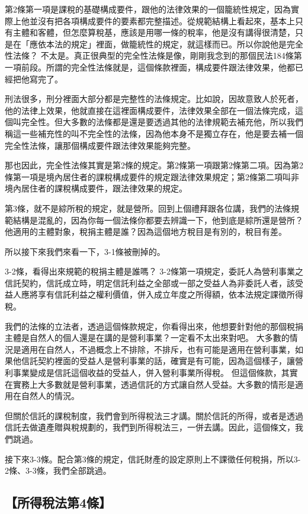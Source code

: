 \documentclass[]{ctexbook}
\begin{document}
第2條第一項是課稅的基礎構成要件，跟他的法律效果的一個籠統性規定，因為實際上他並沒有把各項構成要件的要素都完整描述。從規範結構上看起來，基本上只有主體和客體，但怎麼算稅基，應該是用哪一條的稅率，他是沒有講得很清楚，只是在「應依本法的規定」裡面，做籠統性的規定，就這樣而已。所以你說他是完全性法條？ 不太是。真正很典型的完全性法條是像，剛剛我念到的那個民法184條第一項前段。所謂的完全性法條就是，這個條款裡面，構成要件跟法律效果，他都已經把他寫完了。

刑法很多，刑分裡面大部分都是完整性的法條規定。比如說，因故意致人於死者，他的法律上效果，他就直接在這裡面構成要件，法律效果全部在一個法條完成，這個叫完全性。但大多數的法條都是還是要透過其他的法律規範去補充他，所以我們稱這一些補充性的叫不完全性的法條，因為他本身不是獨立存在，他是要去補一個完全性法條，讓那個構成要件跟法律效果能夠完整。

那也因此，完全性法條其實是第2條的規定。第2條第一項跟第2條第二項。因為第2條第一項是境內居住者的課稅構成要件的規定跟法律效果規定；第2條第二項叫非境內居住者的課稅構成要件，跟法律效果的規定。

第3條，就不是綜所稅的規定，就是營所。回到上個禮拜跟各位講，我們的法條規範結構是混亂的，因為你每一個法條你都要去辨識一下，他到底是綜所還是營所？他適用的主體對象，稅捐主體是誰？因為這個地方稅目是有別的，稅目有差。

所以接下來我們來看一下，3-1條被刪掉的。

3-2條，看得出來規範的稅捐主體是誰嗎？
3-2條第一項規定，委託人為營利事業之信託契約，信託成立時，明定信託利益之全部或一部之受益人為非委託人者，該受益人應將享有信託利益之權利價值，併入成立年度之所得額，依本法規定課徵所得稅。

我們的法條的立法者，透過這個條款規定，你看得出來，他想要針對他的那個稅捐主體是自然人的個人還是在講的是營利事業？一定看不太出來對吧。
大多數的情況是適用在自然人，不過概念上不排除，不排斥，也有可能是適用在營利事業，如果他信託契約裡面的受益人是營利事業的話，確實是有可能，因為這個樣子，讓營利事業變成是信託這個收益的受益人，併入營利事業所得稅。
但這個條款，其實在實務上大多數就是營利事業，透過信託的方式讓自然人受益。大多數的情形是適用在自然人的情況。

但關於信託的課稅制度，我們會到所得稅法三才講。關於信託的所得，或者是透過信託去做遺產贈與稅規劃的，我們到所得稅法三，一併去講。因此，這個條文，我們跳過。

接下來3-3條。配合第3條的規定，信託財產的設定原則上不課徵任何稅捐，所以3-2條、3-3條，我們全部跳過。

\hypertarget{ux6240ux5f97ux7a05ux6cd5ux7b2c4ux689d}{%
\subsection{【所得稅法第4條】}\label{ux6240ux5f97ux7a05ux6cd5ux7b2c4ux689d}}
\end{document}
